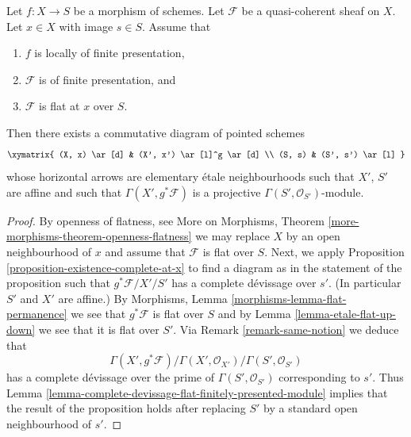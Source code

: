 \begin{proposition}
\label{proposition-finite-presentation-flat-at-point}
Let $f : X \to S$ be a morphism of schemes.
Let $\mathcal{F}$ be a quasi-coherent sheaf on $X$.
Let $x \in X$ with image $s \in S$.
Assume that
\begin{enumerate}
\item $f$ is locally of finite presentation,
\item $\mathcal{F}$ is of finite presentation, and
\item $\mathcal{F}$ is flat at $x$ over $S$.
\end{enumerate}
Then there exists a commutative diagram of pointed schemes
$$
\xymatrix{
(X, x) \ar[d] & (X', x') \ar[l]^g \ar[d] \\
(S, s) & (S', s') \ar[l]
}
$$
whose horizontal arrows are elementary \'etale neighbourhoods
such that $X'$, $S'$ are affine and such that
$\Gamma(X', g^*\mathcal{F})$ is a projective
$\Gamma(S', \mathcal{O}_{S'})$-module.
\end{proposition}

\begin{proof}
By openness of flatness, see
More on Morphisms, Theorem \ref{more-morphisms-theorem-openness-flatness}
we may replace $X$ by an open neighbourhood of $x$ and assume that
$\mathcal{F}$ is flat over $S$. Next, we apply
Proposition \ref{proposition-existence-complete-at-x}
to find a diagram as in the statement of the proposition such
that $g^*\mathcal{F}/X'/S'$ has a complete d\'evissage over $s'$.
(In particular $S'$ and $X'$ are affine.) By
Morphisms, Lemma \ref{morphisms-lemma-flat-permanence}
we see that $g^*\mathcal{F}$ is flat over $S$ and by
Lemma \ref{lemma-etale-flat-up-down}
we see that it is flat over $S'$. Via
Remark \ref{remark-same-notion}
we deduce that
$$
\Gamma(X', g^*\mathcal{F})/
\Gamma(X', \mathcal{O}_{X'})/
\Gamma(S', \mathcal{O}_{S'})
$$
has a complete d\'evissage over the prime of $\Gamma(S', \mathcal{O}_{S'})$
corresponding to $s'$. Thus
Lemma \ref{lemma-complete-devissage-flat-finitely-presented-module}
implies that the result of the proposition holds after replacing
$S'$ by a standard open neighbourhood of $s'$.
\end{proof}
